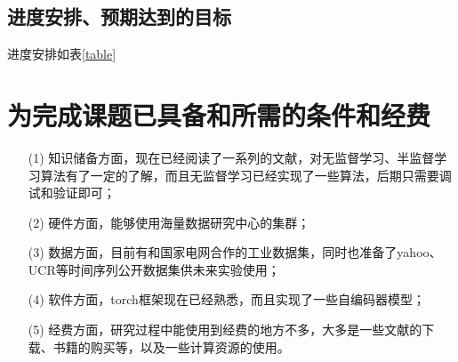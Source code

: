 \subsection{进度安排、预期达到的目标}

进度安排如表\ref{table}

\begin{table}[]
    \caption{进度安排}
    \label{table}
\end{table}

\section{为完成课题已具备和所需的条件和经费}

\begin{itemize}
    \item[(1)] 知识储备方面，现在已经阅读了一系列的文献，对无监督学习、半监督学习算法有了一定的了解，而且无监督学习已经实现了一些算法，后期只需要调试和验证即可；
    \item[(2)] 硬件方面，能够使用海量数据研究中心的集群；
    \item[(3)] 数据方面，目前有和国家电网合作的工业数据集，同时也准备了yahoo、UCR等时间序列公开数据集供未来实验使用；
    \item[(4)] 软件方面，torch框架现在已经熟悉，而且实现了一些自编码器模型；
    \item[(5)] 经费方面，研究过程中能使用到经费的地方不多，大多是一些文献的下载、书籍的购买等，以及一些计算资源的使用。
\end{itemize}

